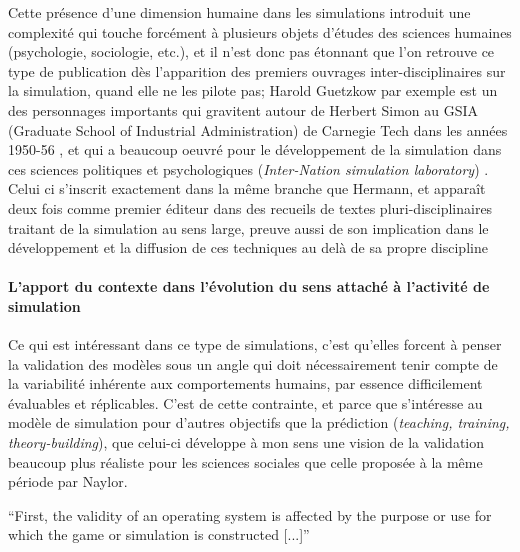 Cette présence d'une dimension humaine dans les simulations introduit une complexité qui touche forcément à plusieurs objets d'études des sciences humaines (psychologie, sociologie, etc.), et il n'est donc pas étonnant que l'on retrouve ce type de publication dès l'apparition des premiers ouvrages inter-disciplinaires sur la simulation, quand elle ne les pilote pas; Harold Guetzkow par exemple est un des personnages importants qui gravitent autour de Herbert Simon au GSIA (Graduate School of Industrial Administration) de Carnegie Tech dans les années 1950-56 \autocite{Guetzkow2004}, et qui a beaucoup oeuvré pour le développement de la simulation dans ces sciences politiques et psychologiques (\textit{Inter-Nation simulation laboratory}) \autocite{Janda2011, Druckman2010}. Celui ci s'inscrit exactement dans la même branche que Hermann, et apparaît deux fois comme premier éditeur dans des recueils de textes pluri-disciplinaires traitant de la simulation au sens large, preuve aussi de son implication dans le développement et la diffusion de ces techniques au delà de sa propre discipline \autocite{Guetzkow1962, Guetzkow1972}

\paragraph{L'apport du contexte dans l'évolution du sens attaché à l'activité de simulation}

Ce qui est intéressant dans ce type de simulations, c'est qu'elles forcent à penser la validation des modèles sous un angle qui doit nécessairement tenir compte de la variabilité inhérente aux comportements humains, par essence difficilement évaluables et réplicables. C'est de cette contrainte, et parce que \textcite{Hermann1967} s'intéresse au modèle de simulation pour d'autres objectifs que la prédiction (\textit{teaching, training, theory-building}), que celui-ci développe à mon sens une vision de la validation beaucoup plus réaliste pour les sciences sociales que celle proposée à la même période par Naylor.

\foreignquote{english}{First, the validity of an operating system is affected by the purpose or use for which the game or simulation is constructed [...]}\autocite[217]{Hermann1967}

